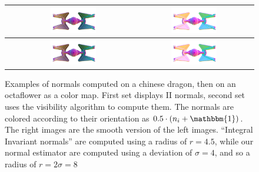 \documentclass[runningheads]{llncs}
\begin{document}
\begin{figure}
\begin{tabular}{|c||c|c|}
            \hline
            \raisebox{18mm}{II} &
            \includegraphics[width=0.4\textwidth]{pictures/tie256-IIN-flat-edge.jpg} &
            \includegraphics[width=0.4\textwidth]{pictures/tie256-IIN-flat.jpg} \\
            \hline
            \raisebox{18mm}{Ours} &
            \includegraphics[width=0.4\textwidth]{pictures/tie256-VN-flat-edge.jpg} &
            \includegraphics[width=0.4\textwidth]{pictures/tie256-VN-flat.jpg} \\
            \hline
        \end{tabular}
        \caption{Examples of normals computed on a chinese dragon, then on an
        octaflower as a color map. First set displays II normals, second set
        uses the visibility algorithm to compute them. The normals are colored
        according to their orientation as $0.5 \cdot (n_i + \mathbbm{1})$. The
        right images are the smooth version of the left images. ``Integral
        Invariant normals'' are computed using a radius of $r=4.5$, while
        our normal estimator are computed using a deviation of $\sigma=4$, and so
        a radius of $r=2\sigma=8$}
        \label{fig:normals-estimation}
    \end{figure}
\end{document}
